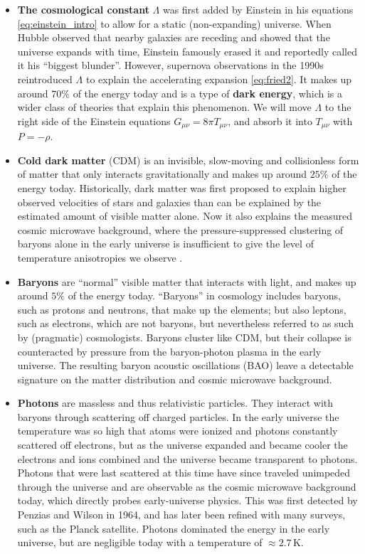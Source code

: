 \documentclass[USenglish, thumbmarks]{uiophdthesis} %
\begin{document}
\begin{itemize}
\item \textbf{The cosmological constant}
$\Lambda$ was first added by Einstein in his equations \eqref{eq:einstein_intro}
to allow for a static (non-expanding) universe.
When Hubble observed that nearby galaxies are receding and showed that the universe expands with time,
Einstein famously erased it and reportedly called it his \enquote{biggest blunder}.
However, supernova observations in the 1990s reintroduced $\Lambda$ to explain the accelerating expansion \eqref{eq:fried2}.
It makes up around $70\%$ of the energy today and is a type of \textbf{dark energy},
which is a wider class of theories that explain this phenomenon.
We will move $\Lambda$ to the right side of the Einstein equations $G_{\mu\nu} = 8\pi T_{\mu\nu}$,
and absorb it into $T_{\mu\nu}$ with $P = -\rho$.

\item \textbf{Cold dark matter} (CDM)
is an invisible, slow-moving and collisionless form of matter
that only interacts gravitationally and makes up around $25\%$ of the energy today.
Historically, dark matter was first proposed to explain higher observed velocities of stars and galaxies
than can be explained by the estimated amount of visible matter alone.
Now it also explains the measured cosmic microwave background,
where the pressure-suppressed clustering of baryons alone in the early universe
is insufficient to give the level of temperature anisotropies we observe
\cite[e.g.][]{bertoneHistoryDarkMatter2018}.

\item \textbf{Baryons}
are \enquote{normal} visible matter that interacts with light,
and makes up around $5\%$ of the energy today.
\enquote{Baryons} in cosmology includes baryons, such as protons and neutrons, that make up the elements;
but also leptons, such as electrons, which are not baryons, but nevertheless referred to as such by (pragmatic) cosmologists.
Baryons cluster like CDM, but their collapse is counteracted by pressure from the baryon-photon plasma in the early universe.
The resulting baryon acoustic oscillations (BAO) leave a detectable signature on the matter distribution and cosmic microwave background.

\item \textbf{Photons}
are massless and thus relativistic particles.
They interact with baryons through scattering off charged particles.
In the early universe the temperature was so high that atoms were ionized and photons constantly scattered off electrons,
but as the universe expanded and became cooler the electrons and ions combined and the universe became transparent to photons.
Photons that were last scattered at this time have since traveled unimpeded through the universe and are observable as the cosmic microwave background today,
which directly probes early-universe physics.
This was first detected by Penzias and Wilson in 1964,
and has later been refined with many surveys, such as the Planck satellite.
Photons dominated the energy in the early universe,
but are negligible today with a temperature of $\approx 2.7\,\mathrm{K}$.


\end{itemize}
\end{document}
